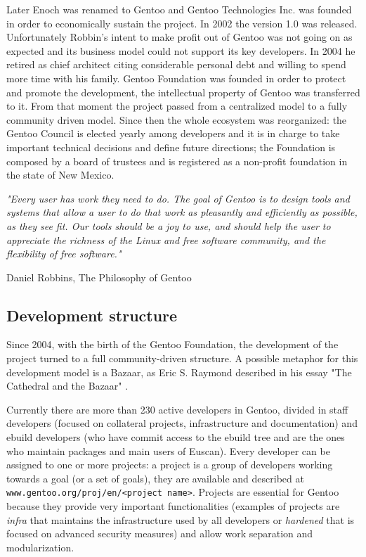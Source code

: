 Later Enoch was renamed to Gentoo and Gentoo Technologies Inc. was founded in order to economically sustain the project. In 2002 the version 1.0 was released.
Unfortunately Robbin's intent to make profit out of Gentoo was not going on as expected and its business model could not support its key developers.
In 2004 he retired as chief architect citing considerable personal debt and willing to spend more time with his family. Gentoo Foundation was founded in order to protect and promote the development, the intellectual property of Gentoo was transferred to it. From that moment the project passed from a centralized model to a fully community driven model.
Since then the whole ecosystem was reorganized: the Gentoo Council is elected yearly among developers and it is in charge to take important technical decisions and define future directions; the Foundation is composed by a board of trustees and is registered as a non-profit foundation in the state of New Mexico.

\vspace{0.8cm}
\emph{"Every user has work they need to do. The goal of Gentoo is to design tools and systems that allow a user to do that work as pleasantly and efficiently as possible, as they see fit. Our tools should be a joy to use, and should help the user to appreciate the richness of the Linux and free software community, and the flexibility of free software."}
\vspace{0.2cm}

\hfill Daniel Robbins, The Philosophy of Gentoo \cite{gentoo_philosophy}


\subsection{Development structure}
Since 2004, with the birth of the Gentoo Foundation, the development of the project turned to a full community-driven structure. A possible metaphor for this development model is a Bazaar, as Eric S. Raymond described in his essay "The Cathedral and the Bazaar" \cite{cathedral_bazaar}.

Currently there are more than 230 active developers in Gentoo, divided in staff developers (focused on collateral projects, infrastructure and documentation) and ebuild developers (who have commit access to the ebuild tree and are the ones who maintain packages and main users of Euscan).
Every developer can be assigned to one or more projects: a project is a group of developers working towards a goal (or a set of goals), they are available and described at \texttt{www.gentoo.org/proj/en/<project name>}. Projects are essential for Gentoo because they provide very important functionalities (examples of projects are \emph{infra} that maintains the infrastructure used by all developers or \emph{hardened} that is focused on advanced security measures) and allow work separation and modularization.

